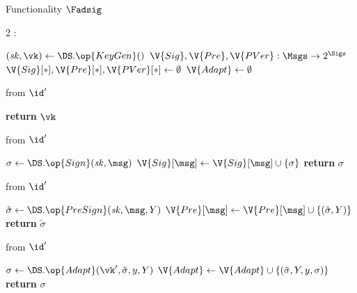 \begin{interface}[nofloat]{Functionality $\Fadsig$ \\
}

{\scriptsize
\setlength{\columnsep}{1.4em}
\begin{multicols}{2}
:
\begin{algorithmic}[1]
\setcounter{contline}{0}\algcont
\State $(\mathit{sk}, \vk) \gets \DS.\op{KeyGen}()$ \label{ln:adsigkg}
\State $\V{Sig}, \V{Pre}, \V{PVer} : \Msgs \to 2^{\Sigs}$
\State $\V{Sig}[*], \V{Pre}[*], \V{PVer}[*] \gets \emptyset$
\State $\V{Adapt} \gets \emptyset$
\algsave
\end{algorithmic}
\vspace{1.4ex}

 \quad from $\id'$
\begin{algorithmic}[1]
\algcont
\State \textbf{return} $\vk$
\algsave
\end{algorithmic}
\vspace{1.4ex}

 \quad from $\id'$
\begin{algorithmic}[1]
\algcont
{} \label{ln:adsigowner}
\State $\sigma \gets \DS.\op{Sign}(\mathit{sk}, \msg)$
\If{$\sigma \neq \none$}
\State $\V{Sig}[\msg] \gets \V{Sig}[\msg] \cup \{\sigma\}$
\EndIf
\State \textbf{return} $\sigma$
\algsave
\end{algorithmic}
\vspace{1.4ex}

 \quad from $\id'$
\begin{algorithmic}[1]
\algcont
{}
\State $\tilde{\sigma} \gets \DS.\op{PreSign}(\mathit{sk}, \msg, Y)$
\If{$\tilde{\sigma} \neq \none$}
\State $\V{Pre}[\msg] \gets \V{Pre}[\msg] \cup \{(\tilde{\sigma}, Y)\}$
\EndIf
\State \textbf{return} $\tilde{\sigma}$
\algsave
\end{algorithmic}
\vspace{1.4ex}

 \quad from $\id'$
\begin{algorithmic}[1]
\algcont
\State $\sigma \gets \DS.\op{Adapt}(\vk', \tilde{\sigma}, y, Y)$
\State $\V{Adapt} \gets \V{Adapt} \cup \{(\tilde{\sigma}, Y, y, \sigma)\}$
\EndIf
\State \textbf{return} $\sigma$
\algsave
\end{algorithmic}
\vspace{1.4ex}


\end{multicols}}
\end{interface}
